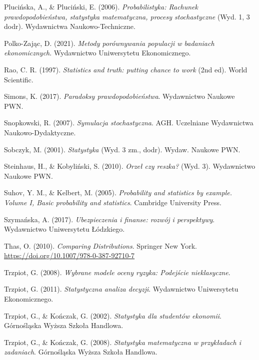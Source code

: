 \documentclass[
  letterpaper,
  DIV=11,
  numbers=noendperiod]{scrreprt}
\newlength{\cslhangindent}
\newenvironment{CSLReferences}[2] %
 {\begin{list}{}{%
  \setlength{\itemindent}{0pt}
  \setlength{\leftmargin}{0pt}
  \setlength{\parsep}{0pt}
  \ifodd #1
   \setlength{\leftmargin}{\cslhangindent}
   \setlength{\itemindent}{-1\cslhangindent}
  \fi
  \setlength{\itemsep}{#2\baselineskip}}}
 {\end{list}}
\begin{document}
\begin{CSLReferences}{1}{0}
Plucińska, A., \& Pluciński, E. (2006). \emph{Probabilistyka: Rachunek
prawdopodobie{ń}stwa, statystyka matematyczna, procesy stochastyczne}
(Wyd. 1, 3 dodr). Wydawnictwa Naukowo-Techniczne.

Polko-Zając, D. (2021). \emph{Metody porównywania populacji w badaniach
ekonomicznych}. Wydawnictwo Uniwersytetu Ekonomicznego.

Rao, C. R. (1997). \emph{Statistics and truth: putting chance to work}
(2nd ed). World Scientific.

Simons, K. (2017). \emph{Paradoksy prawdopodobie{ń}stwa}. Wydawnictwo
Naukowe PWN.

Snopkowski, R. (2007). \emph{Symulacja stochastyczna}. AGH. Uczelniane
Wydawnictwa Naukowo-Dydaktyczne.

Sobczyk, M. (2001). \emph{Statystyka} (Wyd. 3 zm., dodr). Wydaw. Naukowe
PWN.

Steinhaus, H., \& Kobyliński, S. (2010). \emph{Orze{ł} czy reszka?}
(Wyd. 3). Wydawnictwo Naukowe PWN.

Suhov, Y. M., \& Kelbert, M. (2005). \emph{Probability and statistics by
example. Volume I, Basic probability and statistics}. Cambridge
University Press.

Szymańska, A. (2017). \emph{Ubezpieczenia i finanse: rozwój i
perspektywy}. Wydawnictwo Uniwersytetu {Ł}ódzkiego.

Thas, O. (2010). \emph{Comparing Distributions}. Springer New York.
\url{https://doi.org/10.1007/978-0-387-92710-7}

Trzpiot, G. (2008). \emph{Wybrane modele oceny ryzyka: Podejście
nieklasyczne}.

Trzpiot, G. (2011). \emph{Statystyczna analiza decyzji}. Wydawnictwo
Uniwersytetu Ekonomicznego.

Trzpiot, G., \& Kończak, G. (2002). \emph{Statystyka dla studentów
ekonomii}. Górno{ś}l{ą}ska Wy{ż}sza Szko{ł}a Handlowa.

Trzpiot, G., \& Kończak, G. (2008). \emph{Statystyka matematyczna w
przyk{ł}adach i zadaniach}. Górno{ś}l{ą}ska Wy{ż}sza Szko{ł}a Handlowa.


\end{CSLReferences}
\end{document}
